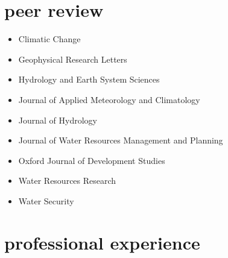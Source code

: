 \documentclass[11pt,article,oneside]{memoir}
\begin{document}

\section{peer review}

\mbox{}\vspace{-\dimexpr\baselineskip\relax}

\begin{itemize}[label={}]

  \item Climatic Change

  \item Geophysical Research Letters

  \item Hydrology and Earth System Sciences

  \item Journal of Applied Meteorology and Climatology

  \item Journal of Hydrology

  \item Journal of Water Resources Management and Planning

  \item Oxford Journal of Development Studies

  \item Water Resources Research

  \item Water Security

\end{itemize}


\section{professional experience}

\mbox{}\vspace{-\dimexpr\baselineskip\relax}
\end{document}
